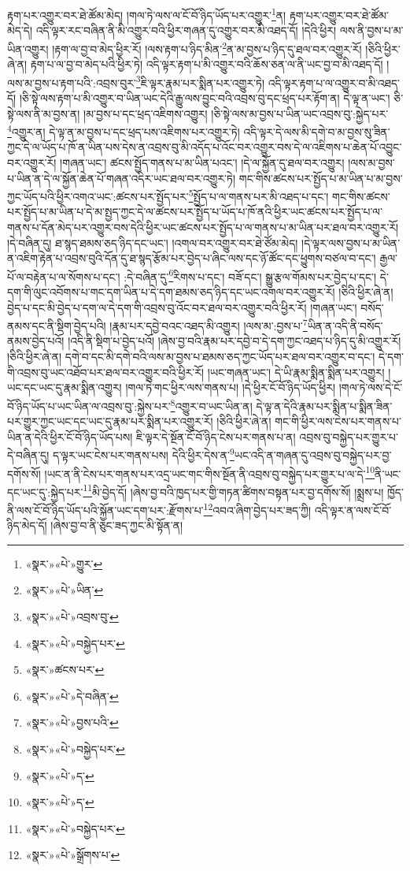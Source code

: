 རྟག་པར་འགྱུར་བར་ཐེ་ཚོམ་མེད། །གལ་ཏེ་ལས་ལ་ངོ་བོ་ཉིད་ཡོད་པར་འགྱུར་\footnote{«སྣར་»«པེ་»གྱུར་}ན། རྟག་པར་འགྱུར་བར་ཐེ་ཚོམ་མེད་དེ། འདི་ལྟར་རང་བཞིན་ནི་མི་འགྱུར་བའི་ཕྱིར་གཞན་དུ་འགྱུར་བར་མི་འཐད་དོ། །དེའི་ཕྱིར། ལས་ནི་བྱས་པ་མ་ཡིན་འགྱུར། །རྟག་ལ་བྱ་བ་མེད་ཕྱིར་རོ། །ལས་རྟག་པ་ཉིད་མིན་\footnote{«སྣར་»«པེ་»ཡིན་}ན་མ་བྱས་པ་ཉིད་དུ་ཐལ་བར་འགྱུར་རོ། །ཅིའི་ཕྱིར་ཞེ་ན། རྟག་པ་ལ་བྱ་བ་མེད་པའི་ཕྱིར་ཏེ། འདི་ལྟར་རྟག་པ་མི་འགྱུར་བའི་ཆོས་ཅན་ལ་ནི་ཡང་བྱ་བ་མི་འཐད་དོ། །ལས་མ་བྱས་པ་རྟག་པའི་:འབྲས་བུར་\footnote{«སྣར་»«པེ་»འབྲས་བུ་}ཇི་ལྟར་རྣམ་པར་སྨིན་པར་འགྱུར་ཏེ། འདི་ལྟར་རྟག་པ་ལ་འགྱུར་བ་མི་འཐད་དོ། །ཅི་སྟེ་ལས་རྟག་པ་མི་འགྱུར་བ་ཡིན་ཡང་དེའི་རྒྱུ་ལས་བྱུང་བའི་འབྲས་བུ་དང་ཕྲད་པར་རྟོག་ན། དེ་ལྟ་ན་ཡང་། ཅི་སྟེ་ལས་ནི་མ་བྱས་ན། །མ་བྱས་པ་དང་ཕྲད་འཇིགས་འགྱུར། །ཅི་སྟེ་ལས་མ་བྱས་པ་ཡིན་ཡང་འབྲས་བུ་:སྐྱེད་པར་\footnote{«སྣར་»«པེ་»བསྐྱེད་པར་}འགྱུར་ན། དེ་ལྟ་ན་མ་བྱས་པ་དང་ཕྲད་པས་འཇིགས་པར་འགྱུར་ཏེ། འདི་ལྟར་དེ་ལས་མི་དགེ་བ་མ་བྱས་སུ་ཟིན་ཀྱང་དེ་ལ་ཡོད་པ་ཁོ་ན་ཡིན་པས་དེས་ན་འབྲས་བུ་མི་འདོད་པ་འོང་བར་འགྱུར་བས་དེ་ལ་འཇིགས་པ་ཆེན་པོ་འབྱུང་བར་འགྱུར་རོ། །གཞན་ཡང་། ཚངས་སྤྱོད་གནས་པ་མ་ཡིན་པའང་། །དེ་ལ་སྐྱོན་དུ་ཐལ་བར་འགྱུར། །ལས་མ་བྱས་པ་ཡིན་ན་དེ་ལ་སྐྱོན་ཆེན་པོ་གཞན་འདིར་ཡང་ཐལ་བར་འགྱུར་ཏེ། གང་གིས་ཚངས་པར་སྤྱོད་པ་མ་ཡིན་པ་མ་བྱས་ཀྱང་ཡོད་པའི་ཕྱིར་འགའ་ཡང་:ཚངས་པར་སྤྱོད་པར་\footnote{«སྣར་»ཚངས་པར་}སྤྱོད་པ་ལ་གནས་པར་མི་འཐད་པ་དང་། གང་གིས་ཚངས་པར་སྤྱོད་པ་མ་ཡིན་པ་དེ་མ་སྤྱད་ཀྱང་དེ་ལ་ཚངས་པར་སྤྱོད་པ་ཡོད་པ་ཁོ་ནའི་ཕྱིར་ཡང་ཚངས་པར་སྤྱོད་པ་ལ་གནས་པ་དོན་མེད་པར་འགྱུར་བས་དེའི་ཕྱིར་ཡང་ཚངས་པར་སྤྱོད་པ་ལ་གནས་པ་མ་ཡིན་པར་ཐལ་བར་འགྱུར་རོ། །དེ་བཞིན་དུ། ཐ་སྙད་ཐམས་ཅད་ཉིད་དང་ཡང་། །འགལ་བར་འགྱུར་བར་ཐེ་ཙོམ་མེད། །དེ་ལྟར་ལས་བྱས་པ་མ་ཡིན་ན་འཇིག་རྟེན་པ་འབྲས་བུའི་དོན་དུ་ཐ་སྙད་རྩོམ་པར་བྱེད་པ་ཞིང་ལས་དང་ཉོ་ཚོང་དང་ཕྱུགས་བཙལ་བ་དང་། རྒྱལ་པོ་ལ་བརྟེན་པ་ལ་སོགས་པ་དང་། :དེ་བཞིན་དུ་\footnote{«སྣར་»«པེ་»དེ་བཞིན་}རིགས་པ་དང་། བཟོ་དང་། སྒྱུ་རྩལ་གོམས་པར་བྱེད་པ་དང་། དེ་དག་གི་ལུང་འབོགས་པ་གང་དག་ཡིན་པ་དེ་དག་ཐམས་ཅད་ཉིད་དང་ཡང་འགལ་བར་འགྱུར་རོ། །ཅིའི་ཕྱིར་ཞེ་ན། བྱེད་པ་དང་མི་བྱེད་པ་དག་ལ་དེ་དག་གི་འབྲས་བུ་འོང་བར་ཐལ་བར་འགྱུར་བའི་ཕྱིར་རོ། །གཞན་ཡང་། བསོད་ནམས་དང་ནི་སྡིག་བྱེད་པའི། །རྣམ་པར་དབྱེ་བའང་འཐད་མི་འགྱུར། །ལས་མ་:བྱས་པ་\footnote{«སྣར་»«པེ་»བྱས་པའི་}ཡིན་ན་འདི་ནི་བསོད་ནམས་བྱེད་པའོ། །འདི་ནི་སྡིག་པ་བྱེད་པའོ། །ཞེས་བྱ་བའི་རྣམ་པར་དབྱེ་བ་དེ་དག་ཀྱང་འཐད་པ་ཉིད་དུ་མི་འགྱུར་རོ། །ཅིའི་ཕྱིར་ཞེ་ན། དགེ་བ་དང་མི་དགེ་བའི་ལས་མ་བྱས་པ་ཐམས་ཅད་ཀྱང་ཡོད་པར་ཐལ་བར་འགྱུར་བ་དང་། དེ་དག་གི་འབྲས་བུ་ཡང་འཐོབ་པར་ཐལ་བར་འགྱུར་བའི་ཕྱིར་རོ། །ཡང་གཞན་ཡང་། དེ་ཡི་རྣམ་སྨིན་སྨིན་པར་འགྱུར། །ཡང་དང་ཡང་དུ་རྣམ་སྨིན་འགྱུར། །གལ་ཏེ་གང་ཕྱིར་ལས་གནས་པ། །དེ་ཕྱིར་ངོ་བོ་ཉིད་ཡོད་ཕྱིར། །གལ་ཏེ་ལས་དེ་ངོ་བོ་ཉིད་ཡོད་པ་ཡང་ཡིན་ལ་འབྲས་བུ་:སྐྱེས་པར་\footnote{«སྣར་»«པེ་»བསྐྱེད་པར་}འགྱུར་བ་ཡང་ཡིན་ན། དེ་ལྟ་ན་དེའི་རྣམ་པར་སྨིན་པ་སྨིན་ཟིན་པར་གྱུར་ཀྱང་ཡང་དང་ཡང་དུ་རྣམ་པར་སྨིན་པར་འགྱུར་རོ། །ཅིའི་ཕྱིར་ཞེ་ན། གང་གི་ཕྱིར་ལས་ངེས་པར་གནས་པ་ཡིན་ན་དེའི་ཕྱིར་ངོ་བོ་ཉིད་ཡོད་པས། ཇི་ལྟར་དེ་སྔོན་ངོ་བོ་ཉིད་ངེས་པར་གནས་པ་ན། འབྲས་བུ་བསྐྱེད་པར་གྱུར་པ་དེ་བཞིན་དུ། ད་ལྟར་ཡང་ངེས་པར་གནས་པས། དེའི་ཕྱིར་དེས་ན་\footnote{«སྣར་»«པེ་»ད་}ཡང་འདི་ན་གཞན་དུ་འབྲས་བུ་བསྐྱེད་པར་བྱ་དགོས་སོ། །ཡང་ན་ནི་ངེས་པར་གནས་པར་འདྲ་ཡང་གང་གིས་སྔོན་ནི་འབྲས་བུ་བསྐྱེད་པར་གྱུར་པ་ལ་དེ་\footnote{«སྣར་»«པེ་»ད་}ནི་ཡང་དང་ཡང་དུ་:སྐྱེད་པར་\footnote{«སྣར་»«པེ་»བསྐྱེད་པར་}མི་བྱེད་དོ། །ཞེས་བྱ་བའི་ཁྱད་པར་གྱི་གཏན་ཚིགས་བསྟན་པར་བྱ་དགོས་སོ། །སྨྲས་པ། ཁྱོད་ནི་ལས་ངོ་བོ་ཉིད་ཡོད་པའི་སྐྱོན་ཡང་དག་པར་:རྫོགས་པ་\footnote{«སྣར་»«པེ་»སྒྲོགས་པ་}འབའ་ཞིག་བྱེད་པར་ཟད་ཀྱི། འདི་ལྟར་ན་ལས་ངོ་བོ་ཉིད་མེད་དོ། །ཞེས་བྱ་བ་ནི་ཅུང་ཟད་ཀྱང་མི་སྟོན་ན། 